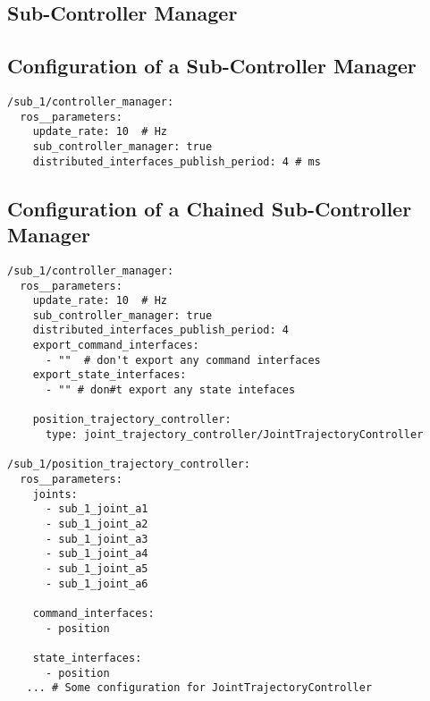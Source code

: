 \subsection{Sub-Controller Manager}

\subsection{Configuration of a Sub-Controller Manager}
\lstset{language=yaml,basicstyle=\scriptsize}
\begin{lstlisting}[caption=Example configuration of a sub-controller manager which exports all of it's command and state interfaces.]
/sub_1/controller_manager:
  ros__parameters:
    update_rate: 10  # Hz
    sub_controller_manager: true
    distributed_interfaces_publish_period: 4 # ms
\end{lstlisting}\label{c5_l_sub_controller_manager_config}
\lstset{language=yaml,basicstyle=\scriptsize}

\subsection{Configuration of a Chained Sub-Controller Manager}
\begin{lstlisting}[caption=Example configuration of a chained sub-controller manager.]
/sub_1/controller_manager:
  ros__parameters:
    update_rate: 10  # Hz
    sub_controller_manager: true
    distributed_interfaces_publish_period: 4
    export_command_interfaces:
      - ""  # don't export any command interfaces
    export_state_interfaces:
      - "" # don#t export any state intefaces

    position_trajectory_controller:
      type: joint_trajectory_controller/JointTrajectoryController

/sub_1/position_trajectory_controller:
  ros__parameters:
    joints:
      - sub_1_joint_a1
      - sub_1_joint_a2
      - sub_1_joint_a3
      - sub_1_joint_a4
      - sub_1_joint_a5
      - sub_1_joint_a6

    command_interfaces:
      - position

    state_interfaces:
      - position
   ... # Some configuration for JointTrajectoryController 
\end{lstlisting}\label{c5_l_chained_sub_controller_manager_config}
